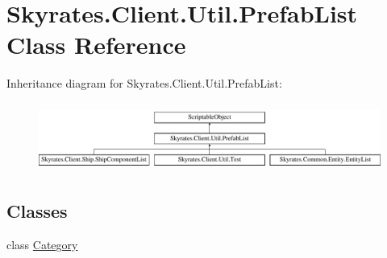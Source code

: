 \hypertarget{class_skyrates_1_1_client_1_1_util_1_1_prefab_list}{\section{Skyrates.\-Client.\-Util.\-Prefab\-List Class Reference}
\label{class_skyrates_1_1_client_1_1_util_1_1_prefab_list}
}


 


Inheritance diagram for Skyrates.\-Client.\-Util.\-Prefab\-List\-:\begin{figure}[H]
\begin{center}
\leavevmode
\includegraphics[height=2.285714cm]{class_skyrates_1_1_client_1_1_util_1_1_prefab_list}
\end{center}
\end{figure}
\subsection*{Classes}
\begin{DoxyCompactItemize}
\item 
class \hyperlink{class_skyrates_1_1_client_1_1_util_1_1_prefab_list_1_1_category}{Category}
\end{DoxyCompactItemize}
